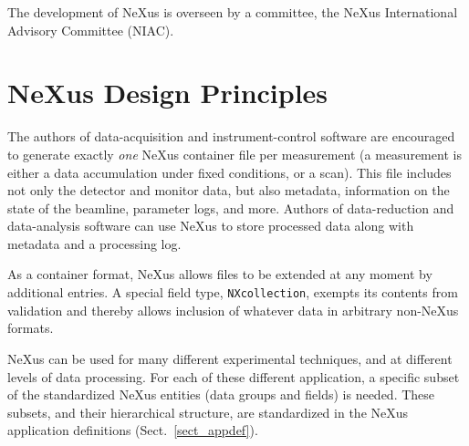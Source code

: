 \documentclass[%
 aip,
rsi,
 amsmath,amssymb,
 reprint,%
]{revtex4-1}
\begin{document}
The development of NeXus is overseen by a committee, the NeXus International Advisory Committee (NIAC).

\section{NeXus Design Principles}

The authors of data-acquisition and instrument-control software are encouraged to generate exactly \emph{one} NeXus container file per measurement
(a measurement is either a data accumulation under fixed conditions,
or a scan).
This file includes not only the detector and monitor data,
but also metadata, information on the state of the beamline, parameter logs, and more.
Authors of data-reduction and data-analysis software can use NeXus to
store processed data along with metadata and a processing log.

As a container format, NeXus allows files to be extended at any moment by
additional entries.
A special field type, \texttt{NXcollection}, exempts its contents from validation
and thereby allows inclusion of whatever data in arbitrary non-NeXus formats.

NeXus can be used for many different experimental techniques,
and at different levels of data processing.
For each of these different application,
a specific subset of the standardized NeXus entities 
(data groups and fields) is needed.
These subsets, and their hierarchical structure, are standardized
in the NeXus application definitions (Sect.~\ref{sect_appdef}).
\end{document}
